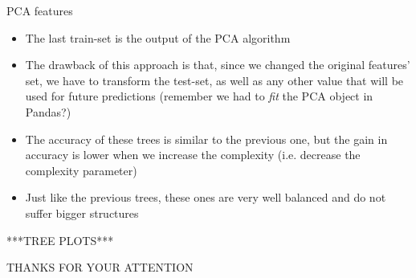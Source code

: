 	\begin{frame}
		\begin{block}{PCA features}
			\begin{itemize}
				\vspace{0.3cm}
				\item The last train-set is the output of the PCA algorithm
				\vspace{0.3cm}
				\item The drawback of this approach is that, since we changed the original features' set, we have to transform the test-set, as well as any other value that will be used for future predictions (remember we had to \emph{fit} the PCA object in Pandas?)
				\vspace{0.3cm}
				\item The accuracy of these trees is similar to the previous one, but the gain in accuracy is lower when we increase the complexity (i.e. decrease the complexity parameter)
				\vspace{0.3cm}
				\item Just like the previous trees, these ones are very well balanced and do not suffer bigger structures
				\vspace{0.3cm}
			\end{itemize}
		\end{block}
	\end{frame}
	
	\begin{frame}
		***TREE PLOTS***
	\end{frame}
	
	\begin{frame}
		\begin{center}
			\begin{Huge}
				THANKS FOR YOUR ATTENTION
			\end{Huge}
		\end{center}
	\end{frame}